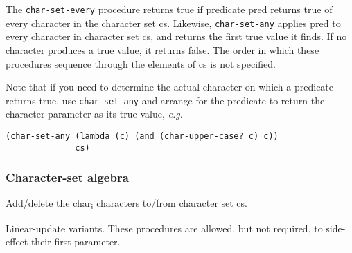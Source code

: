 \begin{entry}{%
  }

  The
  \texttt{char-set-every} procedure returns true if predicate pred
  returns true of every character in the character set cs. Likewise,
  \texttt{char-set-any} applies pred to every character in character
  set cs, and returns the first true value it finds. If no character
  produces a true value, it returns false. The order in which these
  procedures sequence through the elements of cs is not specified.

  Note that if you need to determine the actual character on which a
  predicate returns true, use \texttt{char-set-any} and arrange for
  the predicate to return the character parameter as its true value,
  \emph{e.g.}

\begin{verbatim}
(char-set-any (lambda (c) (and (char-upper-case? c) c)) 
              cs)
\end{verbatim}
\end{entry}

\subsubsection{Character-set algebra}

\begin{entry}{%
  }

  Add/delete the char\textsubscript{i}
  characters to/from character set cs.
\end{entry}

\begin{entry}{%
  }

  Linear-update variants. These procedures are allowed, but
  not required, to side-effect their first parameter.
\end{entry}

